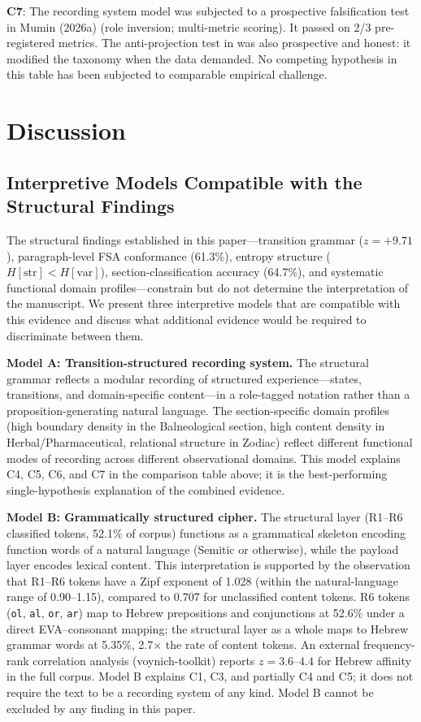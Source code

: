 \documentclass[11pt,a4paper,twocolumn]{article}
\begin{document}
\textbf{C7}: The recording system model was subjected to a prospective falsification test in Mumin (2026a) (role inversion; multi-metric scoring). It passed on 2/3 pre-registered metrics. The anti-projection test in  was also prospective and honest: it modified the taxonomy when the data demanded. No competing hypothesis in this table has been subjected to comparable empirical challenge.

\section{Discussion}
\label{sec:discussion}

\subsection{Interpretive Models Compatible with the Structural Findings}

The structural findings established in this paper---transition grammar ($z = +9.71$), paragraph-level FSA conformance (61.3\%), entropy structure ($H[\text{str}] < H[\text{var}]$), section-classification accuracy (64.7\%), and systematic functional domain profiles---constrain but do not determine the interpretation of the manuscript. We present three interpretive models that are compatible with this evidence and discuss what additional evidence would be required to discriminate between them.

\textbf{Model A: Transition-structured recording system.} The structural grammar reflects a modular recording of structured experience---states, transitions, and domain-specific content---in a role-tagged notation rather than a proposition-generating natural language. The section-specific domain profiles (high boundary density in the Balneological section, high content density in Herbal/Pharmaceutical, relational structure in Zodiac) reflect different functional modes of recording across different observational domains. This model explains C4, C5, C6, and C7 in the comparison table above; it is the best-performing single-hypothesis explanation of the combined evidence.

\textbf{Model B: Grammatically structured cipher.} The structural layer (R1--R6 classified tokens, 52.1\% of corpus) functions as a grammatical skeleton encoding function words of a natural language (Semitic or otherwise), while the payload layer encodes lexical content. This interpretation is supported by the observation that R1--R6 tokens have a Zipf exponent of 1.028 (within the natural-language range of 0.90--1.15), compared to 0.707 for unclassified content tokens. R6 tokens (\texttt{ol}, \texttt{al}, \texttt{or}, \texttt{ar}) map to Hebrew prepositions and conjunctions at 52.6\% under a direct EVA--consonant mapping; the structural layer as a whole maps to Hebrew grammar words at 5.35\%, 2.7$\times$ the rate of content tokens. An external frequency-rank correlation analysis (voynich-toolkit) reports $z = 3.6$--$4.4$ for Hebrew affinity in the full corpus. Model B explains C1, C3, and partially C4 and C5; it does not require the text to be a recording system of any kind. Model B cannot be excluded by any finding in this paper.
\end{document}
